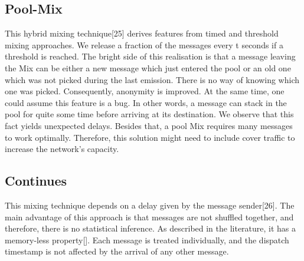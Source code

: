 \documentclass[logo,msc,cyber]{infthesis}   %
\begin{document}
\subsection{Pool-Mix}
This hybrid mixing technique[25] derives features from timed and threshold
mixing approaches. We release a fraction of the messages every t seconds if a
threshold is reached. The bright side of this realisation is that a message
leaving the Mix can be either a new message which just entered the pool or an
old one which was not picked during the last emission. There is no way of
knowing which one was picked. Consequently, anonymity is improved. At the same
time, one could assume this feature is a bug. In other words, a message can
stack in the pool for quite some time before arriving at its destination. We
observe that this fact yields unexpected delays. Besides that, a pool Mix
requires many messages to work optimally. Therefore, this solution might need to
include cover traffic to increase the network's capacity.

\subsection{Continues}
This mixing technique depends on a delay given by the message sender[26]. The
main advantage of this approach is that messages are not shuffled together, and
therefore, there is no statistical inference. As described in the literature, it
has a memory-less property[]. Each message is treated individually, and the
dispatch timestamp is not affected by the arrival of any other message.
\end{document}

